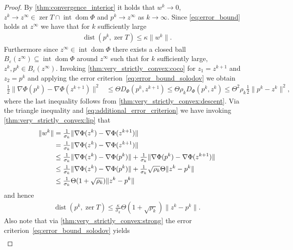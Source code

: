 \documentclass[11pt,onecolumn]{article}
\DeclareMathOperator{\dom}{dom}
\DeclareMathOperator{\intr}{int}
\DeclareMathOperator{\zer}{zer}
\DeclareMathOperator{\dist}{dist}
\theoremstyle{remark}
\begin{document}
\begin{proof} 
    By \cref{thm:convergence_interior} it holds that $w^k \to 0$, $z^k \to z^\infty \in \zer T \cap \intr \dom \Phi$ and $p^k \to z^\infty$ as $k \to \infty$. Since \cref{eq:error_bound} holds at $z^\infty$ we have that for $k$ sufficiently large
    \begin{align}
    \dist(p^{k}, \zer T) \leq \kappa \|w^k\|.
    \end{align}
    Furthermore since $z^\infty \in \intr \dom \Phi$ there exists a closed ball $B_\varepsilon(z^\infty)\subseteq \intr\dom \Phi$ around $z^\infty$ such that for $k$ sufficiently large, $z^k,p^k \in B_\varepsilon(z^\infty)$. 
    Invoking \cref{thm:very_strictly_convex:coco} for $z_1=z^{k+1}$ and $z_2=p^k$ and applying the error criterion~\cref{eq:error_bound_solodov} we obtain
    \begin{align} \label{eq:additional_error_criterion}
        \tfrac{1}{2}\|\nabla \Phi(p^k)-\nabla \Phi(z^{k+1})\|^2 &\leq \Theta D_\Phi(p^k, z^{k+1}) \leq \Theta \rho_k D_\Phi(p^k, z^k) \leq \Theta^2\rho_k \tfrac{1}{2}\|p^k - z^k\|^2,
    \end{align}
    where the last inequality follows from \cref{thm:very_strictly_convex:descent}.
Via the triangle inequality and \cref{eq:additional_error_criterion} we have invoking \cref{thm:very_strictly_convex:lip} that
    \begin{align}
    \|w^k\| &= \tfrac{1}{\sigma_k}\|\nabla \Phi(z^k) - \nabla \Phi(z^{k+1})\| \notag\\
    &= \tfrac{1}{\sigma_k}\|\nabla \Phi(z^k)
    - \nabla \Phi(z^{k+1})\| \notag\\
 &\leq \tfrac{1}{\sigma_k}\|\nabla \Phi(z^k) - \nabla \Phi(p^k)\|+ \tfrac{1}{\sigma_k}\|\nabla \Phi(p^k) - \nabla \Phi(z^{k+1})\| \notag\\
 &\leq \tfrac{1}{\sigma_k}\|\nabla \Phi(z^k) - \nabla \Phi(p^k)\| + \tfrac{1}{\sigma_k}\sqrt{\rho_k} \Theta \|z^{k} - p^k\| \notag\\
 &\leq \tfrac{1}{\sigma_k}\Theta(1+\sqrt{\rho_k})\|z^k - p^k\|
    \end{align}
    and hence
    \begin{align} \label{eq:bound_euclidean_23}
       \dist(p^{k}, \zer T) \leq \tfrac{\kappa}{\sigma_k}\Theta(1+\sqrt{\rho_k})\|z^k - p^k\|.
    \end{align}
    Also note that via \cref{thm:very_strictly_convex:strong} the error criterion~\cref{eq:error_bound_solodov} yields
    \begin{align} \label{eq:bound_euclidean_2}

\end{align}
\end{proof}
\end{document}
